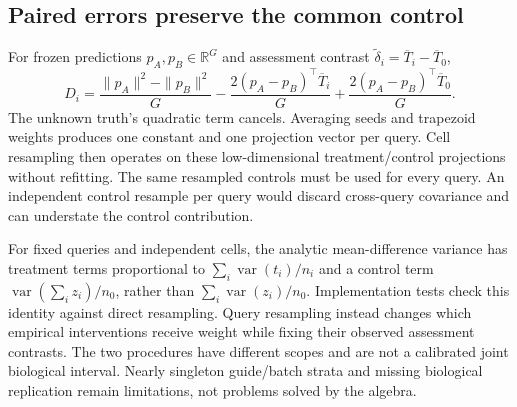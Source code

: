 \subsection{Paired errors preserve the common control}
For frozen predictions $p_A,p_B\in\mathbb R^G$ and assessment contrast $\widetilde\delta_i=\overline T_i-\overline T_0$,
\begin{equation}
 D_i=\frac{\|p_A\|^2-\|p_B\|^2}{G}
      -\frac{2(p_A-p_B)^\top\overline T_i}{G}
      +\frac{2(p_A-p_B)^\top\overline T_0}{G}.
\end{equation}
The unknown truth's quadratic term cancels. Averaging seeds and trapezoid weights produces one constant and one projection vector per query. Cell resampling then operates on these low-dimensional treatment/control projections without refitting. The same resampled controls must be used for every query. An independent control resample per query would discard cross-query covariance and can understate the control contribution.

For fixed queries and independent cells, the analytic mean-difference variance has treatment terms proportional to $\sum_i\operatorname{var}(t_i)/n_i$ and a control term $\operatorname{var}(\sum_i z_i)/n_0$, rather than $\sum_i\operatorname{var}(z_i)/n_0$. Implementation tests check this identity against direct resampling. Query resampling instead changes which empirical interventions receive weight while fixing their observed assessment contrasts. The two procedures have different scopes and are not a calibrated joint biological interval. Nearly singleton guide/batch strata and missing biological replication remain limitations, not problems solved by the algebra.
